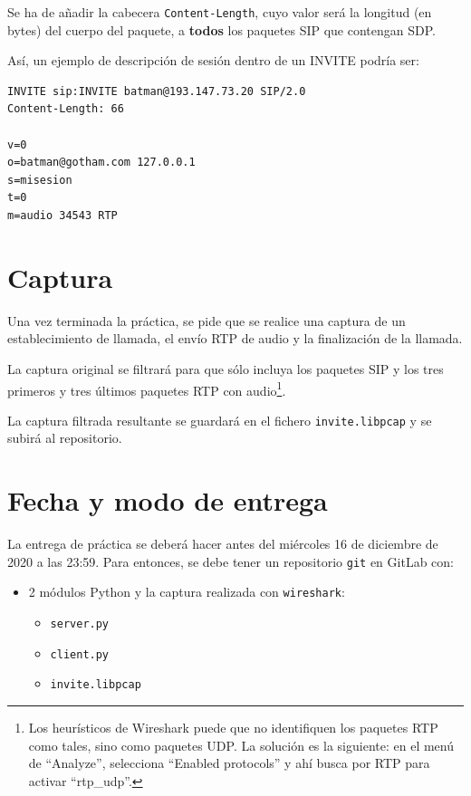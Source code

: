 \documentclass[a4paper,11pt]{article}
\begin{document}
Se ha de añadir la cabecera \texttt{Content-Length}, cuyo valor será la longitud (en bytes) del cuerpo del paquete, a {\bf todos} los paquetes SIP que contengan SDP.

Así, un ejemplo de descripción de sesión dentro de un INVITE podría ser:

\begin{verbatim}
INVITE sip:INVITE batman@193.147.73.20 SIP/2.0
Content-Length: 66

v=0
o=batman@gotham.com 127.0.0.1
s=misesion
t=0
m=audio 34543 RTP
\end{verbatim}




\section*{Captura}

Una vez terminada la práctica, se pide que se realice una captura de un
establecimiento de llamada, el envío RTP de audio y la finalización de
la llamada. 

La captura original se filtrará para que sólo incluya los paquetes
SIP y los tres primeros y tres últimos paquetes RTP con audio\footnote{Los heurísticos de Wireshark puede que no identifiquen los paquetes RTP como tales, sino como paquetes UDP. La solución es la siguiente: en el menú de ``Analyze'', selecciona ``Enabled protocols'' y ahí busca por RTP para activar ``rtp\_udp''.}.

La captura filtrada resultante se guardará en el fichero \texttt{invite.libpcap}
y se subirá al repositorio.


\section*{Fecha y modo de entrega}

La entrega de práctica se deberá hacer antes del miércoles 16 de diciembre de 2020 a las 23:59. Para entonces, se debe tener un repositorio \texttt{git} en GitLab con: 

    \begin{itemize}
        \item 2 módulos Python y la captura realizada con \texttt{wireshark}:
    \begin{itemize}
      \item \texttt{server.py}
      \item \texttt{client.py}
      \item \texttt{invite.libpcap}
    \end{itemize}
\end{itemize}
\end{document}

